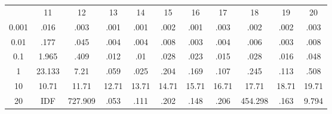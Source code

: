 \begin{center}
\begin{table} [ht]
\begin{tabular}{|c|c|c|c|c|c|c|c|c|c|c| }
\end{tabular}
\\
\\
\begin{tabular}{|c|c|c|c|c|c|c|c|c|c|c| } 
\hline
 & 11 & 12 & 13 & 14 & 15 & 16 & 17 & 18 & 19 & 20 \\
0.001 & .016 & .003 & .001 & .001 & .002 & .001 & .003 & .002 & .002 & .003 \\
0.01 & .177 & .045 & .004 & .004 & .008 & .003 & .004 & .006 & .003 & .008 \\
0.1 & 1.965 & .409 & .012 & .01 & .028 & .023 & .015 & .028 & .016 & .048 \\
1 & 23.133 & 7.21 & .059 & .025 & .204 & .169 & .107 & .245 & .113 & .508 \\
10 & 10.71 & 11.71 & 12.71 & 13.71 & 14.71 & 15.71 & 16.71 & 17.71 & 18.71 & 19.71 \\
20 & IDF & 727.909 & .053 & .111 & .202 & .148 & .206 & 454.298 & .163 & 9.794 \\


\end{tabular}
\end{table}


\begin{comment}
\begin{table} [ht]
\tiny
\caption{MongoDB Without Index}
\label{mongodb-noindex-query-result-table}
\begin{tabular}{|c|c|c|c|c|c|c|c|c|c|c| } 
    &  1 & 2 & 3 & 4 & 5 & 6 & 7 & 8 & 9 & 10 \\
 \hline
0001 & 0 & 0.003 & 0.003 & 0 & 0 & 0.001 & 0 & 0.01 & 0.011 & 0.004	\\
001 & 0 & 0.008 & 0.006 & 0 & 0 & 0.001 & 0 & 0.031 & 0.028 & 0.046	\\
01 & 0.001 & 0.04 & 0.043 & 0 & 0.002 & 0.001 & 0 & 0.074 & 0.092 & 0.89	\\
1 & 0 & 0.372 & 0.43 & 0 & 0.012 & 0.001 & 0 & 0.52 & 0.801 & 43.082	\\
5 & 0 & 1.885 & 2.14 & 0 & 0.605 & 0.002 & 0 & 2.757 & 6.14 & 1007.605	\\
10 & 0 & 5.243 & 5.552 & 0 & 1.178 & 0.002 & 0 & 7.004 & 12.145 & 0	\\
20 & 0 & 10.677 & 11.423 & 0 & 7.522 & 0.002 & 0 & 23.183 & 67.314 & 0	\\



\end{comment}
\end{center}
